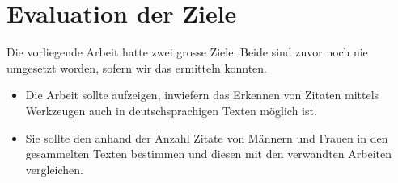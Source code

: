 




\section{Evaluation der Ziele}

Die vorliegende Arbeit hatte zwei grosse Ziele. Beide sind zuvor noch nie umgesetzt worden,
sofern wir das ermitteln konnten.

\begin{itemize}
    \item Die Arbeit sollte aufzeigen, inwiefern das Erkennen von Zitaten mittels  Werkzeugen auch in deutschsprachigen Texten möglich ist.
    \item Sie sollte den  anhand der Anzahl Zitate von Männern und Frauen in den gesammelten Texten bestimmen
    und diesen mit den verwandten Arbeiten vergleichen.
\end{itemize}

